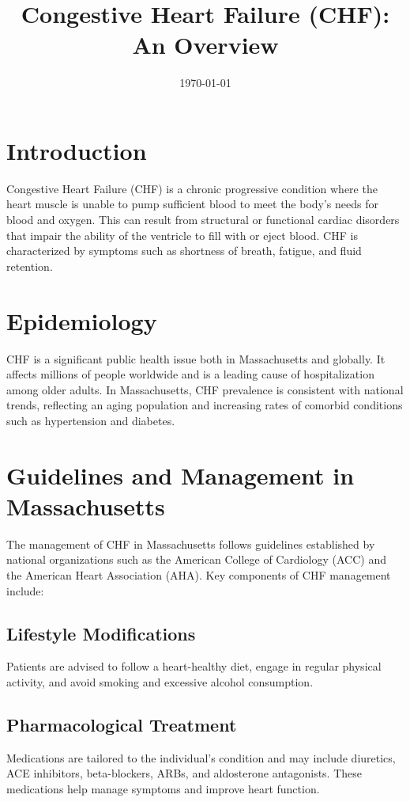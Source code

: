 \documentclass{article}
\title{Congestive Heart Failure (CHF): An Overview}
\author{}
\date{\today}
\begin{document}
\maketitle

\section{Introduction}
Congestive Heart Failure (CHF) is a chronic progressive condition where the heart muscle is unable to pump sufficient blood to meet the body's needs for blood and oxygen. This can result from structural or functional cardiac disorders that impair the ability of the ventricle to fill with or eject blood. CHF is characterized by symptoms such as shortness of breath, fatigue, and fluid retention.

\section{Epidemiology}
CHF is a significant public health issue both in Massachusetts and globally. It affects millions of people worldwide and is a leading cause of hospitalization among older adults. In Massachusetts, CHF prevalence is consistent with national trends, reflecting an aging population and increasing rates of comorbid conditions such as hypertension and diabetes.

\section{Guidelines and Management in Massachusetts}
The management of CHF in Massachusetts follows guidelines established by national organizations such as the American College of Cardiology (ACC) and the American Heart Association (AHA). Key components of CHF management include:

\subsection{Lifestyle Modifications}
Patients are advised to follow a heart-healthy diet, engage in regular physical activity, and avoid smoking and excessive alcohol consumption.

\subsection{Pharmacological Treatment}
Medications are tailored to the individual's condition and may include diuretics, ACE inhibitors, beta-blockers, ARBs, and aldosterone antagonists. These medications help manage symptoms and improve heart function.
\end{document}
